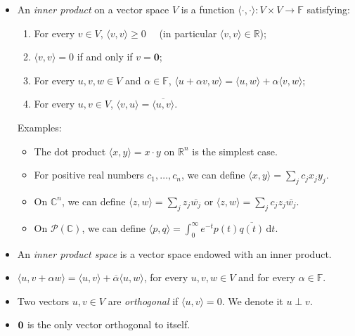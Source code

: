 \documentclass[11pt]{article}
\newcommand{\1}{\mathbf{1}}
\newcommand{\inner}[2]{\langle #1, #2 \rangle}
\newcommand{\dd}{{\mathrm{d}}}
\newcommand{\0}{\mathbf{0}}
\newcommand{\C}{\mathbb{C}}
\newcommand{\R}{\mathbb{R}}
\newcommand{\cP}{\mathcal{P}}
\DeclareMathOperator{\mydot}{\boldsymbol{\cdot}}
\renewcommand{\geq}{\geqslant}
\begin{document}
{\begin{itemize}
\item

An \emph{inner product} on a vector space $V$ is a function $\inner{\cdot}{\cdot}:V\times V\to\mathbb{F}$ satisfying:
\begin{enumerate}
\item For every $v\in V$, $ \inner{v}{v} \geq 0$ \ \ (in particular $\inner{v}{v} \in\mathbb{R}$);
\item $\inner{v}{v}=0$ if and only if $v={\mathbf{0}}$;
\item For every $u,v,w\in V$ and $\alpha\in\mathbb{F}$, $\inner{u+\alpha v}{w}=\inner{u}{w}+\alpha \inner{v}{w}$;
\item For every $u,v\in V$, $\inner{v}{u}=\overline{\inner{u}{v}}$.
\end{enumerate}
Examples:
\begin{itemize}
\item
The dot product $\inner{x}{y} = x \mydot y$ on $\R^n$ is the simplest case.

\item
For positive real numbers $c_1,\dots,c_n$, we can define $\inner{x}{y} = \sum_j c_j x_j y_j$.

\item
On $\C^n$, we can define $\inner{z}{w} = \sum_j z_j \overline{w_j}$ or $\inner{z}{w} = \sum_j c_j z_j \overline{w_j}$.

\item
On $\cP(\C)$, we can define $ \inner{p}{q} = \int_0^\infty e^{-t}p(t)\overline{q(t)} \, \dd t $.

\end{itemize}

\item

An \emph{inner product space} is a vector space endowed with an inner product.

\item 

$\langle u,v+\alpha w\rangle=\langle u,v\rangle+\overline{\alpha}\langle u,w\rangle$, for every $u,v,w\in V$ and for every $\alpha \in \mathbb{F}$.

\item

Two vectors $u,v\in V$ are \emph{orthogonal} if $\langle u,v\rangle=0$.
We denote it $u\perp v$.

\item

${\bf 0}$ is the only vector orthogonal to itself.

\end{itemize}


}
\end{document}
